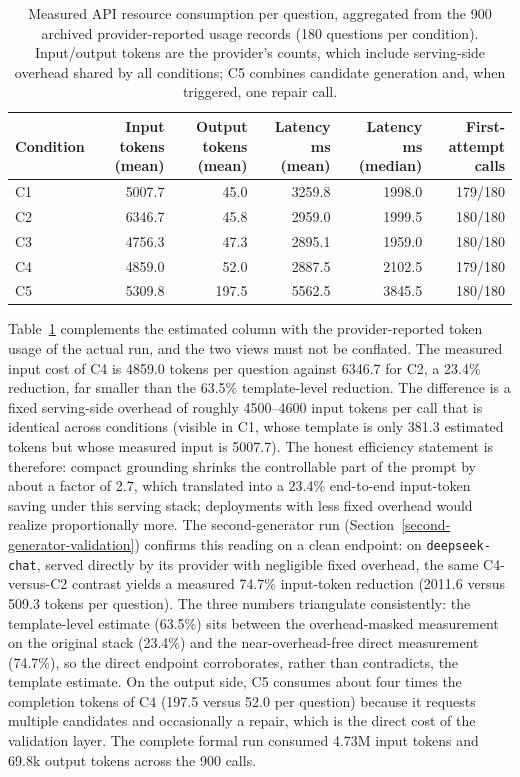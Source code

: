 \documentclass{ieeeaccess}
\begin{document}
\begin{table}[t]
\caption{Measured API resource consumption per question, aggregated from the 900 archived provider-reported usage records (180 questions per condition). Input/output tokens are the provider's counts, which include serving-side overhead shared by all conditions; C5 combines candidate generation and, when triggered, one repair call.}
\label{tab:real-tokens}
\centering
\small
\begin{tabular*}{\textwidth}{@{\extracolsep{\fill}}lrrrrr}
\toprule
Condition & Input tokens (mean) & Output tokens (mean) & Latency ms (mean) & Latency ms (median) & First-attempt calls \\
\midrule
C1 & 5007.7 & 45.0 & 3259.8 & 1998.0 & 179/180 \\
C2 & 6346.7 & 45.8 & 2959.0 & 1999.5 & 180/180 \\
C3 & 4756.3 & 47.3 & 2895.1 & 1959.0 & 180/180 \\
C4 & 4859.0 & 52.0 & 2887.5 & 2102.5 & 179/180 \\
C5 & 5309.8 & 197.5 & 5562.5 & 3845.5 & 180/180 \\
\bottomrule
\end{tabular*}
\end{table}

Table~\ref{tab:real-tokens} complements the estimated column with the provider-reported token usage of the actual run, and the two views must not be conflated. The measured input cost of C4 is 4859.0 tokens per question against 6346.7 for C2, a 23.4\% reduction, far smaller than the 63.5\% template-level reduction. The difference is a fixed serving-side overhead of roughly 4500--4600 input tokens per call that is identical across conditions (visible in C1, whose template is only 381.3 estimated tokens but whose measured input is 5007.7). The honest efficiency statement is therefore: compact grounding shrinks the controllable part of the prompt by about a factor of 2.7, which translated into a 23.4\% end-to-end input-token saving under this serving stack; deployments with less fixed overhead would realize proportionally more. The second-generator run (Section~\ref{second-generator-validation}) confirms this reading on a clean endpoint: on \texttt{deepseek-chat}, served directly by its provider with negligible fixed overhead, the same C4-versus-C2 contrast yields a measured 74.7\% input-token reduction (2011.6 versus 509.3 tokens per question). The three numbers triangulate consistently: the template-level estimate (63.5\%) sits between the overhead-masked measurement on the original stack (23.4\%) and the near-overhead-free direct measurement (74.7\%), so the direct endpoint corroborates, rather than contradicts, the template estimate. On the output side, C5 consumes about four times the completion tokens of C4 (197.5 versus 52.0 per question) because it requests multiple candidates and occasionally a repair, which is the direct cost of the validation layer. The complete formal run consumed 4.73M input tokens and 69.8k output tokens across the 900 calls.
\end{document}
